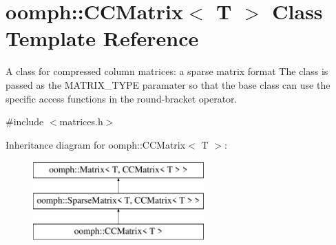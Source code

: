 \hypertarget{classoomph_1_1CCMatrix}{}\section{oomph\+:\+:C\+C\+Matrix$<$ T $>$ Class Template Reference}
\label{classoomph_1_1CCMatrix}


A class for compressed column matrices\+: a sparse matrix format The class is passed as the M\+A\+T\+R\+I\+X\+\_\+\+T\+Y\+PE paramater so that the base class can use the specific access functions in the round-\/bracket operator.  




{\ttfamily \#include $<$matrices.\+h$>$}

Inheritance diagram for oomph\+:\+:C\+C\+Matrix$<$ T $>$\+:\begin{figure}[H]
\begin{center}
\leavevmode
\includegraphics[height=3.000000cm]{classoomph_1_1CCMatrix}
\end{center}
\end{figure}
